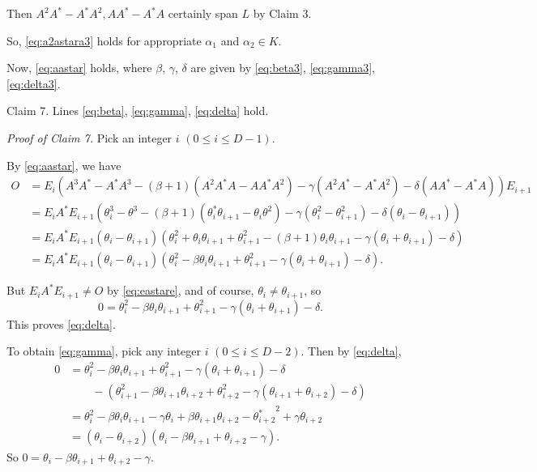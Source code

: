 \documentclass[
]{book}
\theoremstyle{definition}
\theoremstyle{definition}
\theoremstyle{definition}
\theoremstyle{definition}
\theoremstyle{remark}
\begin{document}
Then \(A^2A^*-A^*A^2, AA^*-A^*A\) certainly span \(L\) by Claim 3.

So, \eqref{eq:a2astara3} holds for appropriate \(\alpha_1\) and \(\alpha_2\in K\).

Now, \eqref{eq:aastar} holds, where \(\beta\), \(\gamma\), \(\delta\) are given by \eqref{eq:beta3}, \eqref{eq:gamma3}, \eqref{eq:delta3}.

Claim 7. Lines \eqref{eq:beta}, \eqref{eq:gamma}, \eqref{eq:delta} hold.

\emph{Proof of Claim 7.}
Pick an integer \(i\) \((0\leq i\leq D-1)\).

By \eqref{eq:aastar}, we have
\begin{align}
O & = E_i(A^3A^*-A^*A^3-(\beta+1)(A^2A^*A-AA^*A^2)-\gamma(A^2A^*-A^*A^2)-\delta(AA^*-A^*A))E_{i+1}\\
& = E_iA^*E_{i+1}(\theta^3_i-\theta^3-(\beta+1)(\theta^*_i\theta_{i+1}-\theta_i\theta^2)-\gamma(\theta^2_i-\theta^2_{i+1})-\delta(\theta_i-\theta_{i+1}))\\
& = E_iA^*E_{i+1}(\theta_i-\theta_{i+1})(\theta^2_i+\theta_i\theta_{i+1}+\theta_{i+1}^2-(\beta+1)\theta_i\theta_{i+1}-\gamma(\theta_i+\theta_{i+1})-\delta)\\
& = E_iA^*E_{i+1}(\theta_i-\theta_{i+1})(\theta^2_i-\beta\theta_i\theta_{i+1}+\theta_{i+1}^2-\gamma(\theta_i+\theta_{i+1})-\delta).
\end{align}

But \(E_iA^*E_{i+1} \neq O\) by \eqref{eq:eastare}, and of course, \(\theta_i\neq \theta_{i+1}\), so
\[0 = \theta^2_i-\beta\theta_i\theta_{i+1}+\theta_{i+1}^2-\gamma(\theta_i+\theta_{i+1})-\delta.\]
This proves \eqref{eq:delta}.

To obtain \eqref{eq:gamma}, pick any integer \(i\) \((0\leq i\leq D-2)\).
Then by \eqref{eq:delta},
\begin{align}
0 & = \theta^2_i-\beta\theta_i\theta_{i+1}+\theta_{i+1}^2-\gamma(\theta_i+\theta_{i+1})-\delta\\
& \qquad -(\theta^2_{i+1}-\beta\theta_{i+1}\theta_{i+2}+\theta_{i+2}^2-\gamma(\theta_{i+1}+\theta_{i+2})-\delta)\\
& = \theta_i^2 - \beta\theta_i\theta_{i+1}-\gamma\theta_i + \beta\theta_{i+1}\theta_{i+2}-{\theta^*_{i+2}}^2 + \gamma\theta_{i+2}\\
& = (\theta_i-\theta_{i+2})(\theta_i - \beta\theta_{i+1} + \theta_{i+2} - \gamma).
\end{align}
So \(0 = \theta_i - \beta\theta_{i+1} + \theta_{i+2} - \gamma\).
\end{document}
